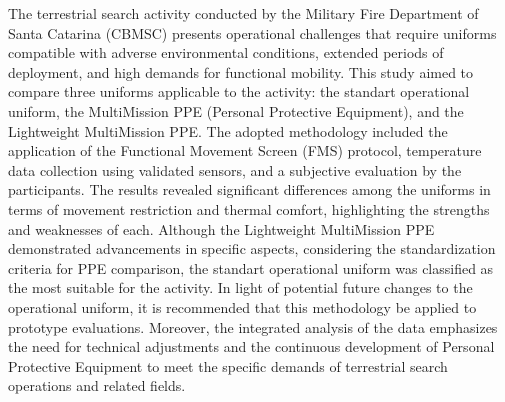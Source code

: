 The terrestrial search activity conducted by the Military Fire Department of Santa Catarina (CBMSC) presents operational 
challenges that require uniforms compatible with adverse environmental conditions, extended periods of deployment, and 
high demands for functional mobility. This study aimed to compare three uniforms applicable to the activity: the standart 
operational uniform, the MultiMission PPE (Personal Protective Equipment), and the Lightweight MultiMission PPE. The adopted methodology included the 
application of the Functional Movement Screen (FMS) protocol, temperature data collection using validated sensors, and a 
subjective evaluation by the participants. The results revealed significant differences among the uniforms in terms of 
movement restriction and thermal comfort, highlighting the strengths and weaknesses of each. Although the Lightweight MultiMission 
PPE demonstrated advancements in specific aspects, considering the standardization criteria for PPE comparison, the standart 
operational uniform was classified as the most suitable for the activity. In light of potential future changes to the
operational uniform, it is recommended that this methodology be applied to prototype evaluations. Moreover, the integrated 
analysis of the data emphasizes the need for technical adjustments and the continuous development of Personal Protective 
Equipment to meet the specific demands of terrestrial search operations and related fields.